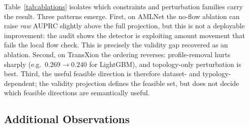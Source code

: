 \documentclass[sigconf,review,anonymous]{acmart}
\begin{document}
Table~\ref{tab:ablations} isolates which constraints and perturbation
families carry the result. Three patterns emerge. First, on AMLNet the
no-flow ablation can raise \emph{raw} AUPRC slightly above the full
projection, but this is not a deployable improvement: the audit shows the
detector is exploiting amount movement that fails the local flow check. This
is precisely the validity gap recovered as an ablation. Second, on TransXion the ordering reverses: profile-removal hurts
sharply (e.g.\ $0.269{\to}0.240$ for LightGBM), and topology-only
perturbation is best. Third, the useful feasible direction is therefore
dataset- and typology-dependent; the validity projection defines the
feasible set, but does not decide which feasible directions are semantically
useful.

\begin{table}[t]
\centering
\caption{Constraint ablation AUPRC (mean $\pm$ std, 3 seeds). Higher raw AUPRC
under no-flow should not be read as a valid improvement; it indicates that
invalid amount movement can be predictive if the model is allowed to exploit
it.}
\label{tab:ablations}
\setlength{\tabcolsep}{3pt}
\renewcommand{\arraystretch}{1.08}
\end{table}

\subsection{Additional Observations}
\label{subsec:additional}
\end{document}
